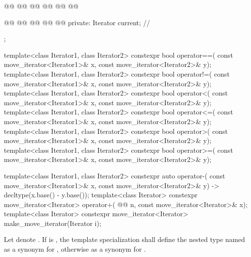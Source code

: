 \begin{codeblock}
{{    @@
      @@
        @@
    @@
      @@
        @@

    @@
      @@
    @@
      @@
        @@
  private:
    Iterator current;   // \expos
  };

  template<class Iterator1, class Iterator2>
    constexpr bool operator==(
      const move_iterator<Iterator1>& x, const move_iterator<Iterator2>& y);
  template<class Iterator1, class Iterator2>
    constexpr bool operator!=(
      const move_iterator<Iterator1>& x, const move_iterator<Iterator2>& y);
  template<class Iterator1, class Iterator2>
    constexpr bool operator<(
      const move_iterator<Iterator1>& x, const move_iterator<Iterator2>& y);
  template<class Iterator1, class Iterator2>
    constexpr bool operator<=(
      const move_iterator<Iterator1>& x, const move_iterator<Iterator2>& y);
  template<class Iterator1, class Iterator2>
    constexpr bool operator>(
      const move_iterator<Iterator1>& x, const move_iterator<Iterator2>& y);
  template<class Iterator1, class Iterator2>
    constexpr bool operator>=(
      const move_iterator<Iterator1>& x, const move_iterator<Iterator2>& y);

  template<class Iterator1, class Iterator2>
    constexpr auto operator-(
      const move_iterator<Iterator1>& x,
      const move_iterator<Iterator2>& y) -> decltype(x.base() - y.base());
  template<class Iterator>
    constexpr move_iterator<Iterator> operator+(
      @@ n,
      const move_iterator<Iterator>& x);
  template<class Iterator>
    constexpr move_iterator<Iterator> make_move_iterator(Iterator i);
}
\end{codeblock}

\begin{removedblock}
\pnum
Let  denote .
If  is ,
the template specialization  shall define
the nested type named  as a synonym for
,
otherwise as a synonym for .
\end{removedblock}

